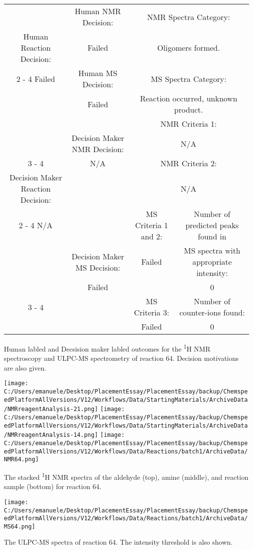 \documentclass{article}%
\begin{document}
\begin{Decision Table}[H]%
\begin{tabular}{|c|c|c|c|}%
\hline%
&Human NMR Decision:&\multicolumn{2}{|c|}{NMR Spectra Category:}\\%
Human Reaction Decision:&Failed&\multicolumn{2}{|c|}{Oligomers formed.}\\%
\cline{2%
-%
4}%
Failed&Human MS Decision:&\multicolumn{2}{|c|}{MS Spectra Category:}\\%
&Failed&\multicolumn{2}{|c|}{Reaction occurred, unknown product.}\\%
\hline%
&&\multicolumn{2}{|c|}{NMR Criteria 1:}\\%
&Decision Maker NMR Decision:&\multicolumn{2}{|c|}{N/A}\\%
\cline{3%
-%
4}%
&N/A&\multicolumn{2}{|c|}{NMR Criteria 2:}\\%
Decision Maker Reaction Decision:&&\multicolumn{2}{|c|}{N/A}\\%
\cline{2%
-%
4}%
N/A&&MS Criteria 1 and 2:&Number of predicted peaks found in\\%
&Decision Maker MS Decision:&Failed&MS spectra with appropriate intensity:\\%
&Failed&&0\\%
\cline{3%
-%
4}%
&&MS Criteria 3:&Number of counter{-}ions found:\\%
&&Failed&0\\%
\hline%
\end{tabular}%
\caption{Human labled and Decsision maker labled outcomes for the \textsuperscript{1}H NMR spectroscopy and ULPC-MS spectrometry of reaction 64. Decision motivations are also given.}%
\end{Decision Table}%
\begin{NMR Spectra}[H]%
\begin{center}%
\texttt{[image: C:/Users/emanuele/Desktop/PlacementEssay/PlacementEssay/backup/ChemspeedPlatformAllVersions/V12/Workflows/Data/StartingMaterials/ArchiveData/NMRreagentAnalysis-21.png]}\hfill%
\texttt{[image: C:/Users/emanuele/Desktop/PlacementEssay/PlacementEssay/backup/ChemspeedPlatformAllVersions/V12/Workflows/Data/StartingMaterials/ArchiveData/NMRreagentAnalysis-14.png]}\hfill%
\texttt{[image: C:/Users/emanuele/Desktop/PlacementEssay/PlacementEssay/backup/ChemspeedPlatformAllVersions/V12/Workflows/Data/Reactions/batch1/ArchiveData/NMR64.png]}\hfill%
\end{center}%
\caption{The stacked \textsuperscript{1}H NMR spectra of the aldehyde (top), amine (middle), and reaction sample (bottom) for reaction 64.}%
\end{NMR Spectra}%
\begin{MS Spectra}[H]%
\begin{center}%
\texttt{[image: C:/Users/emanuele/Desktop/PlacementEssay/PlacementEssay/backup/ChemspeedPlatformAllVersions/V12/Workflows/Data/Reactions/batch1/ArchiveData/MS64.png]}\hfill%
\end{center}%
\caption{The ULPC-MS spectra of reaction 64. The intensity threshold is also shown.}%
\end{MS Spectra}%
\end{document}
